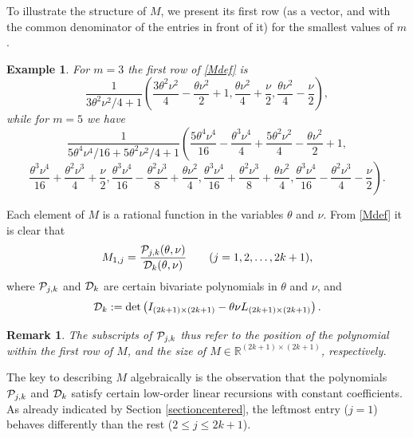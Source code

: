 \documentclass[a4paper]{article}
\newtheorem{remark}{Remark}
\newtheorem{example}{Example}
\newcommand{\te}{\theta}
\newcommand{\cP}{{\cal{P}}}
\newcommand{\cD}{{\cal{D}}}
\begin{document}
To illustrate the structure of $M$, we present its first row (as a vector, and with the common denominator of the entries in front of it) for the smallest values of $m$. 
\begin{example}\label{example1} 
For $m=3$ the first row of \eqref{Mdef} is 
\[
\frac{1}{{3 \theta ^2 \nu ^2}/{4}+1}\left(\frac{3 \theta ^2 \nu ^2}{4}-\frac{\theta  \nu ^2}{2}+1,\frac{\theta  \nu ^2}{4}+\frac{\nu }{2},\frac{\theta  \nu ^2}{4}-\frac{\nu }{2}\right),
\]
while for $m=5$ we have 
\[
\frac{1}{{5 \theta ^4 \nu ^4}/{16}+{5 \theta ^2 \nu ^2}/{4}+1}\left(\frac{5 \theta ^4 \nu ^4}{16}-\frac{\theta ^3 \nu ^4}{4}+\frac{5 \theta ^2 \nu ^2}{4}-\frac{\theta  \nu ^2}{2}+1,\right.
\]
\[
\left.\frac{\theta ^3 \nu
   ^4}{16}+\frac{\theta ^2 \nu ^3}{4}+\frac{\nu }{2},\frac{\theta ^3 \nu ^4}{16}-\frac{\theta ^2 \nu ^3}{8}+\frac{\theta  \nu ^2}{4},\frac{\theta ^3
   \nu ^4}{16}+\frac{\theta ^2 \nu ^3}{8}+\frac{\theta  \nu ^2}{4},\frac{\theta ^3 \nu ^4}{16}-\frac{\theta ^2 \nu ^3}{4}-\frac{\nu }{2}\right).
\]

\end{example}


Each element of $M$ is a rational function in the variables $\te$ and $\nu$. From \eqref{Mdef} it is clear that 
\begin{equation}\label{M1jPjkDk}
M_{1,j}=\frac{\cP_{j,k}(\te,\nu) }{\cD_k(\te,\nu)}\quad\quad(j=1,2,\ldots,2k+1),
\end{equation}
where $\cP_{j,k}$ and $\cD_{k}$ are certain bivariate polynomials in $\te$ and $\nu$, and 
\begin{equation}\label{dendet}
\cD_k:=\det\left(I_{(2k+1)\times(2k+1)}-\te\nu L_{(2k+1)\times(2k+1)}\right).
\end{equation}
\begin{remark}
The subscripts of $\cP_{j,k}$ thus refer to the position of the polynomial within the first row of $M$, and the size of $M\in\mathbb{R}^{(2k+1)\times(2k+1)}$, respectively.
\end{remark}


The key to describing $M$ algebraically is the observation that the polynomials $\cP_{j,k}$ and $\cD_{k}$ satisfy certain low-order linear recursions with constant coefficients. As already indicated by Section \ref{sectioncentered}, the leftmost entry ($j=1$) behaves differently than the rest ($2\le j\le 2k+1$).
\end{document}
